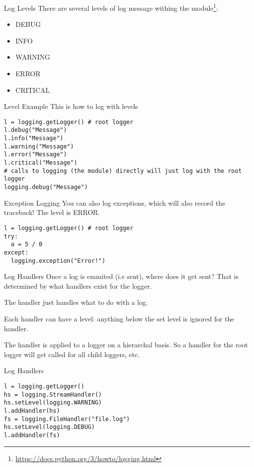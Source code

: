 \begin{frame}{Log Levels}
  There are several levels of log message withing the module\footnote{\url{https://docs.python.org/3/howto/logging.html}}:
  \begin{itemize}
    \item DEBUG
    \item INFO
    \item WARNING
    \item ERROR
    \item CRITICAL
  \end{itemize}
\end{frame}

\begin{frame}[containsverbatim]{Level Example}
  This is how to log with levels
  \begin{verbatim}
l = logging.getLogger() # root logger
l.debug("Message")
l.info("Message")
l.warning("Message")
l.error("Message")
l.critical("Message")
# calls to logging (the module) directly will just log with the root logger
logging.debug("Message")
\end{verbatim}
\end{frame}

\begin{frame}[containsverbatim]{Exception Logging}
  You can also log exceptions, which will also record the traceback! The level is ERROR.
  \begin{verbatim}
l = logging.getLogger() # root logger
try:
  a = 5 / 0
except:
  logging.exception("Error!")
\end{verbatim}
\end{frame}

\begin{frame}{Log Handlers}
  Once a log is emmited (i.e sent), where does it get sent? That is determined by what handlers exist for the logger.

  The handler just handles what to do with a log.

  Each handler can have a level: anything below the set level is ignored for the handler.

  The handler is applied to a logger on a hierarchal basis. So a handler for the root logger will get called for all child loggers, etc.
\end{frame}

\begin{frame}[containsverbatim]{Log Handlers}
  \begin{verbatim}
l = logging.getLogger()
hs = logging.StreamHandler()
hs.setLevel(logging.WARNING)
l.addHandler(hs)
fs = logging.FileHandler("file.log")
hs.setLevel(logging.DEBUG)
l.addHandler(fs)
  \end{verbatim}
\end{frame}

